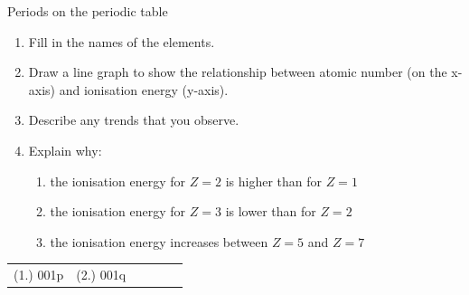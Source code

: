 \begin{exercises}{Periods on the periodic table}
\begin{enumerate}[noitemsep, label=\textbf{\arabic*}. ]
\begin{enumerate}[noitemsep, label=\textbf{\alph*}. ]
 \item Fill in the names of the elements.
\item Draw a line graph to show the relationship between atomic number (on the x-axis) and ionisation energy (y-axis).
\item Describe any trends that you observe.
\item Explain why:
	\begin{enumerate}[noitemsep, label=\textbf{\roman*}. ]
	\item the ionisation energy for $Z=2$ is higher than for $Z=1$
	\item the ionisation energy for $Z=3$ is lower than for $Z=2$
	\item the ionisation energy increases between $Z=5$ and $Z=7$
	\end{enumerate}

\end{enumerate}
\end{enumerate}
      \label{m38757*secfhsst!!!underscore!!!id936}
\practiceinfo
\par 
 \par \begin{tabular}[h]{cccccc}
 (1.) 001p  & (2.) 001q \end{tabular}
\end{exercises}
